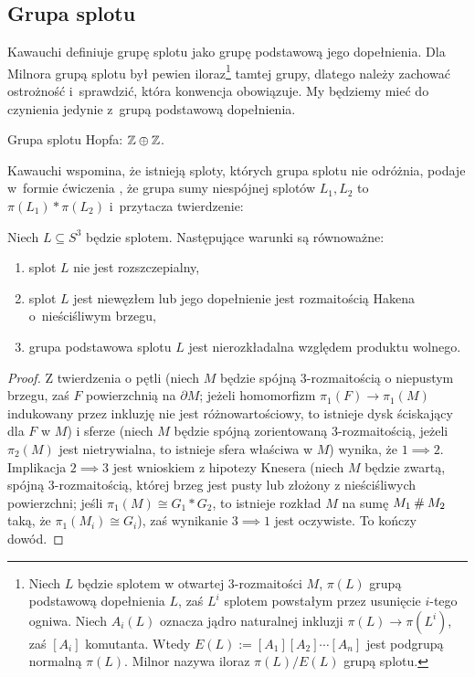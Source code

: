 \subsection{Grupa splotu}

Kawauchi \cite[s. 73]{kawauchi96} definiuje grupę splotu jako grupę podstawową jego dopełnienia.
Dla Milnora \cite{milnor54} grupą splotu był pewien iloraz\footnote{%
Niech $L$ będzie splotem w otwartej 3-rozmaitości $M$, $\pi(L)$ grupą podstawową dopełnienia $L$, zaś $L^i$ splotem powstałym przez usunięcie $i$-tego ogniwa.
Niech $A_i(L)$ oznacza jądro naturalnej inkluzji $\pi(L) \to \pi(L^i)$, zaś $[A_i]$ komutanta.
Wtedy $E(L) := [A_1][A_2] \cdots [A_n]$ jest podgrupą normalną $\pi(L)$.
Milnor nazywa iloraz $\pi(L) / E(L)$ grupą splotu.%
} tamtej grupy, dlatego należy zachować ostrożność i~sprawdzić, która konwencja obowiązuje.
My będziemy mieć do czynienia jedynie z~grupą podstawową dopełnienia.

\begin{example}
    Grupa splotu Hopfa: $\mathbb Z \oplus \mathbb Z$.
\end{example}

Kawauchi wspomina, że istnieją sploty, których grupa splotu nie odróżnia, podaje w~formie ćwiczenia \cite[s. 73]{kawauchi96}, że grupa sumy niespójnej splotów $L_1, L_2$ to $\pi(L_1) * \pi(L_2)$ i~przytacza twierdzenie:

\begin{proposition}
    Niech $L \subseteq S^3$ będzie splotem.
    Następujące warunki są równoważne:
    \begin{enumerate}
        \item splot $L$ nie jest rozszczepialny,
%
        \item splot $L$ jest niewęzłem lub jego dopełnienie jest rozmaitością Hakena o~nieściśliwym brzegu,
%
        \item grupa podstawowa splotu $L$ jest nierozkładalna względem produktu wolnego.
    \end{enumerate}
\end{proposition}

\begin{proof}
    Z twierdzenia o pętli (niech $M$ będzie spójną 3-rozmaitością o niepustym brzegu, zaś $F$ powierzchnią na $\partial M$; jeżeli homomorfizm $\pi_1(F) \to \pi_1(M)$ indukowany przez inkluzję nie jest różnowartościowy, to istnieje dysk ściskający dla $F$ w $M$) i sferze (niech $M$ będzie spójną zorientowaną 3-rozmaitością, jeżeli $\pi_2(M)$ jest nietrywialna, to istnieje sfera właściwa w $M$) wynika, że $1 \implies 2$.
    Implikacja $2 \implies 3$ jest wnioskiem z hipotezy Knesera (niech $M$ będzie zwartą, spójną 3-rozmaitością, której brzeg jest pusty lub złożony z nieściśliwych powierzchni; jeśli $\pi_1(M) \cong G_1 * G_2$, to istnieje rozkład $M$ na sumę $M_1 \mathbin{\#} M_2$ taką, że $\pi_1(M_i) \cong G_i$), zaś wynikanie $3 \implies 1$ jest oczywiste.
    To kończy dowód.
\end{proof}

